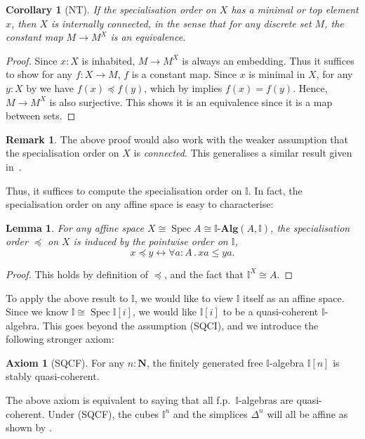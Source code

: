 \documentclass[12pt]{amsart}
\newtheorem{lemma}[theorem]{Lemma}
\newtheorem{corollary}[theorem]{Corollary}
\theoremstyle{definition}
\newtheorem{remark}[theorem]{Remark}
\newtheorem*{axiom}{Axiom}
\newcommand{\mb}[1]{\mathbf{#1}}
\newcommand{\mbb}[1]{\mathbb{#1}}
\newcommand{\I}{\mbb I}
\newcommand{\alg}{\text{-}\mb{Alg}}
\newcommand{\N}{\mb N}
\newcommand{\fa}[2]{\forall #1\!\colon\!\!#2\mathpunct{.}}
\newcommand{\eq}{\leftrightarrow}
\newcommand{\spec}{\operatorname{Spec}}
\begin{document}
\begin{corollary}[NT]\label{cor:connectedpreservediscrete}
  If the specialisation order on $X$ has a minimal or top element $x$, then $X$ is internally connected, in the sense that for any discrete set $M$, the constant map $M \to M^X$ is an equivalence.
\end{corollary}
\begin{proof}
  Since $x:X$ is inhabited, $M \to M^X$ is always an embedding. Thus it suffices to show for any $f : X \to M$, $f$ is a constant map. Since $x$ is minimal in $X$, for any $y:X$ by  we have $f(x) \preceq f(y)$, which by  implies $f(x) = f(y)$. Hence, $M \to M^X$ is also surjective. This shows it is an equivalence since it is a map between sets.
\end{proof}

\begin{remark}
  The above proof would also work with the weaker assumption that the specialisation order on $X$ is \emph{connected}. This generalises a similar result given in~\cite[Prop.~4.4.1]{hyland1990first}.
\end{remark}

Thus, it suffices to compute the specialisation order on $\I$. In fact, the specialisation order on any affine space is easy to characterise:

\begin{lemma}\label{lem:specorderofaffine}
  For any affine space $X \cong \spec A \cong \I\alg(A,\I)$, the specialisation order $\preceq$ on $X$ is induced by the pointwise order on $\I$,
  \[ x \preceq y \eq \fa aA xa \le ya. \]
\end{lemma}
\begin{proof}
  This holds by definition of $\preceq$, and the fact that $\I^X \cong A$.
\end{proof}

To apply the above result to $\I$, we would like to view $\I$ itself as an affine space. Since we know $\I \cong \spec\I[i]$, we would like $\I[i]$ to be a quasi-coherent $\I$-algebra. This goes beyond the assumption (SQCI), and we introduce the following stronger axiom:

\begin{axiom}[SQCF]
  For any $n : \N$, the finitely generated free $\I$-algebra $\I[n]$ is stably quasi-coherent. 
\end{axiom}

The above axiom is equivalent to saying that all f.p.\ $\I$-algebras are quasi-coherent. Under (SQCF), the cubes $\I^n$ and the simplices $\Delta^n$ will all be affine as shown by .
\end{document}
